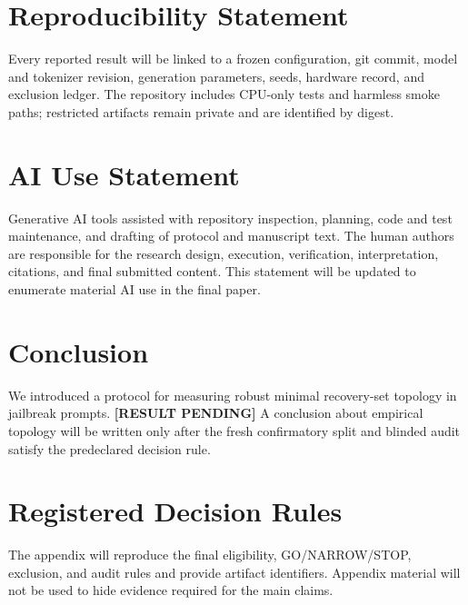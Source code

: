 \documentclass{article}
\newcommand{\resultpending}{\textbf{[RESULT PENDING]}}
\begin{document}
\section{Reproducibility Statement}

Every reported result will be linked to a frozen configuration, git commit,
model and tokenizer revision, generation parameters, seeds, hardware record,
and exclusion ledger. The repository includes CPU-only tests and harmless smoke
paths; restricted artifacts remain private and are identified by digest.

\section{AI Use Statement}

Generative AI tools assisted with repository inspection, planning, code and
test maintenance, and drafting of protocol and manuscript text. The human
authors are responsible for the research design, execution, verification,
interpretation, citations, and final submitted content. This statement will be
updated to enumerate material AI use in the final paper.

\section{Conclusion}

We introduced a protocol for measuring robust minimal recovery-set topology in
jailbreak prompts. \resultpending{} A conclusion about empirical topology will
be written only after the fresh confirmatory split and blinded audit satisfy the
predeclared decision rule.

% 
% 

\appendix

\section{Registered Decision Rules}

The appendix will reproduce the final eligibility, GO/NARROW/STOP, exclusion,
and audit rules and provide artifact identifiers. Appendix material will not be
used to hide evidence required for the main claims.
\end{document}
